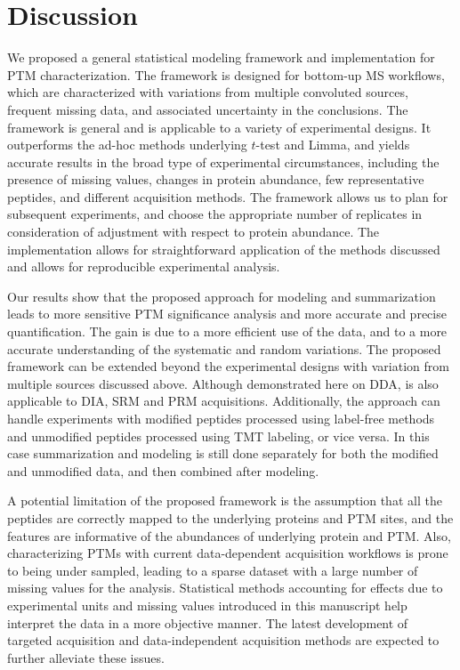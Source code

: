 \documentclass[mcp]{article}
\numberwithin{table}{section}
\begin{document}
\section{Discussion}

We proposed a general statistical modeling framework and implementation for PTM characterization. The framework is designed for bottom-up MS workflows, which are characterized with variations from multiple convoluted sources, frequent missing data, and associated uncertainty in the conclusions. The framework is general and is applicable to a variety of experimental designs. It outperforms the ad-hoc methods underlying $t$-test and Limma, and yields accurate results in the broad type of experimental circumstances, including the presence of missing values, changes in protein abundance, few representative peptides, and different acquisition methods. The framework allows us to plan for subsequent experiments, and choose the appropriate number of replicates in consideration of adjustment with respect to protein abundance. The implementation allows for straightforward application of the methods discussed and allows for reproducible experimental analysis.

Our results show that the proposed approach for modeling and summarization leads to more sensitive PTM significance analysis and more accurate and precise quantification. The gain is due to a more efficient use of the data, and to a more accurate understanding of the systematic and random variations. The proposed framework can be extended beyond the experimental designs with variation from multiple sources discussed above. Although demonstrated here on DDA, is also applicable to DIA, SRM and PRM acquisitions. Additionally, the approach can handle experiments with modified peptides processed using label-free methods and unmodified peptides processed using TMT labeling, or vice versa. In this case summarization and modeling is still done separately for both the modified and unmodified data, and then combined after modeling.

A potential limitation of the proposed framework is the assumption that all the peptides are correctly mapped to the underlying proteins and PTM sites, and the features are informative of the abundances of underlying protein and PTM. Also, characterizing PTMs with current data-dependent acquisition workflows is prone to being under sampled, leading to a sparse dataset with a large number of missing values for the analysis. Statistical methods accounting for effects due to experimental units and missing values introduced in this manuscript help interpret the data in a more objective manner. The latest development of targeted acquisition and data-independent acquisition methods are expected to further alleviate these issues. 
\end{document}
